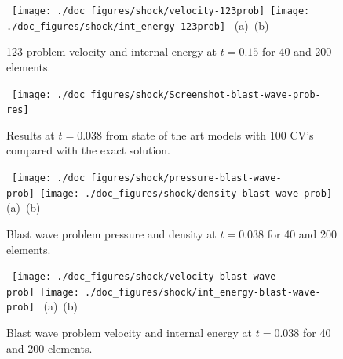 \begin{figure}[H]
\vbox{
\hbox{
\hspace{-1.cm}
\texttt{[image: ./doc\_figures/shock/velocity-123prob]}
\hspace{-1.cm}
\texttt{[image: ./doc\_figures/shock/int\_energy-123prob]}
}
\vspace{-0.cm}
\hbox{\hspace{4.cm}(a) \hspace{4.5cm}(b)}
\vspace{-0.cm}}
\label{123-prob-ve}
\caption{ 123 problem velocity and internal energy 
at $t=0.15$ for 40 and 200 elements. }
\end{figure}



\begin{figure}[H]
\vbox{
\hbox{
\hspace{-1.cm}
\texttt{[image: ./doc\_figures/shock/Screenshot-blast-wave-prob-res]}
}
\vspace{-0.cm}
\vspace{-0.cm}}
\label{Screenshot-blast-wave-prob-res}
\caption{ Results at $t=0.038$ from state of the art models 
with 100 CV's compared with the exact solution.   }
\end{figure}


\begin{figure}[H]
\vbox{
\hbox{
\hspace{-1.cm}
\texttt{[image: ./doc\_figures/shock/pressure-blast-wave-prob]}
\hspace{-1.cm}
\texttt{[image: ./doc\_figures/shock/density-blast-wave-prob]}
}
\vspace{-0.cm}
\hbox{\hspace{4.cm}(a) \hspace{4.5cm}(b)}
\vspace{-0.cm}}
\label{blast-wave--prob-pd}
\caption{ Blast wave problem pressure and density at $t=0.038$ for 
40 and 200 elements. }
\end{figure}


\begin{figure}[H]
\vbox{
\hbox{
\hspace{-1.cm}
\texttt{[image: ./doc\_figures/shock/velocity-blast-wave-prob]}
\hspace{-1.cm}
\texttt{[image: ./doc\_figures/shock/int\_energy-blast-wave-prob]}
}
\vspace{-0.cm}
\hbox{\hspace{4.cm}(a) \hspace{4.5cm}(b)}
\vspace{-0.cm}}
\label{blast-wave--prob-ve}
\caption{ Blast wave problem velocity and internal energy 
at $t=0.038$ for 40 and 200 elements. }
\end{figure}


